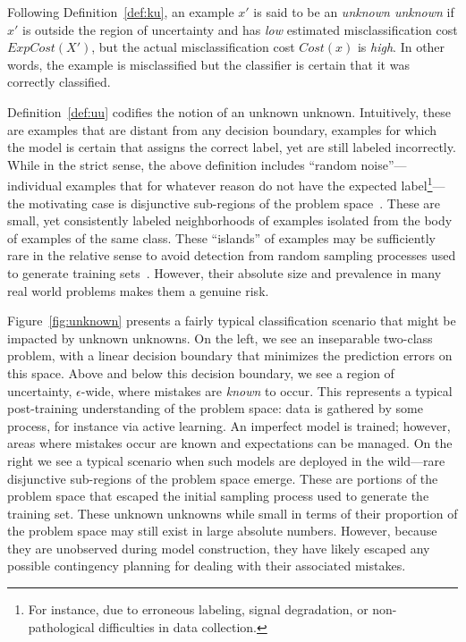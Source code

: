 \begin{definition}
\label{def:uu}
Following Definition~\ref{def:ku}, an example $x'$ is said to be an \emph{unknown unknown} if $x'$ is outside the region of uncertainty and has \emph{low} estimated misclassification cost $\mathit{ExpCost}(X')$, but the actual misclassification cost $\mathit{Cost}(x)$ is \emph{high}. In other words, the example is misclassified but the classifier is certain that it was correctly classified.\smartqed
\end{definition}

Definition~\ref{def:uu} codifies the notion of an unknown unknown. Intuitively, these are examples that are distant from any decision boundary, examples for which the model is certain that assigns the correct label, yet are still labeled incorrectly.  While in the strict sense, the above definition includes ``random noise''---individual examples that for whatever reason do not have the expected label\footnote{For instance,  due to erroneous labeling, signal degradation, or non-pathological difficulties in data collection.}---the motivating case is disjunctive sub-regions of the problem space~\cite{weiss10disjunct}. These are small, yet consistently labeled neighborhoods of examples isolated from the body of examples of the same class. These ``islands'' of examples may be sufficiently rare in the relative sense to avoid detection from random sampling processes used to generate training sets~\cite{attenberg:2010inactive}. However, their absolute size and prevalence in many real world problems makes them a genuine risk.

Figure~\ref{fig:unknown} presents a fairly typical classification
scenario that might be impacted by unknown unknowns. On the left,
we see an inseparable two-class problem, with a linear decision
boundary that minimizes the prediction errors on this space. Above and
below this decision boundary, we see a region of uncertainty, $\epsilon$-wide,
where mistakes are \emph{known} to occur. This
represents a typical post-training understanding of the problem space: 
data is gathered by some process, for instance via active
learning. An imperfect model is trained; however, areas where mistakes
occur are known and expectations can be managed. On the right we see
a typical scenario when such models are deployed in the wild---rare
disjunctive sub-regions of the problem space emerge.  These are portions of the
problem space that escaped the initial sampling process used to generate
the training set. These unknown unknowns while small in terms of their
proportion of the problem space may still exist in large absolute
numbers.  However, because they are unobserved during model
construction, they have likely escaped any possible contingency
planning for dealing with their associated mistakes.

